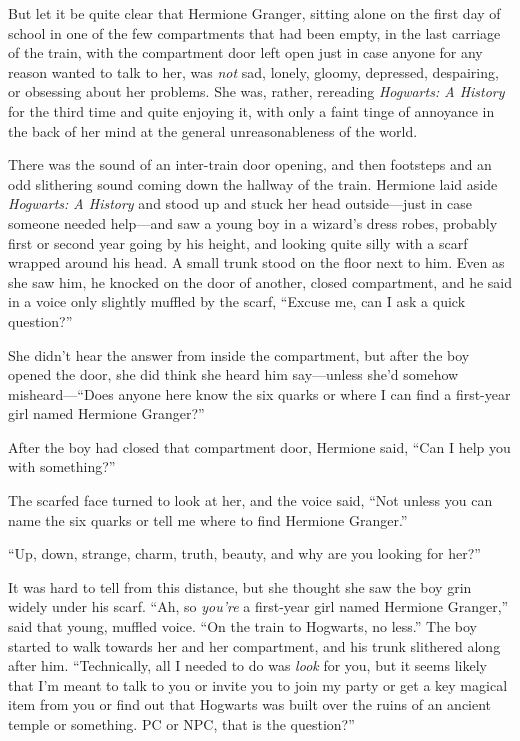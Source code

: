 But let it be quite clear that Hermione Granger, sitting alone on the first day of school in one of the few compartments that had been empty, in the last carriage of the train, with the compartment door left open just in case anyone for any reason wanted to talk to her, was \emph{not} sad, lonely, gloomy, depressed, despairing, or obsessing about her problems. She was, rather, rereading \emph{Hogwarts: A History} for the third time and quite enjoying it, with only a faint tinge of annoyance in the back of her mind at the general unreasonableness of the world.

There was the sound of an inter-train door opening, and then footsteps and an odd slithering sound coming down the hallway of the train. Hermione laid aside \emph{Hogwarts: A History} and stood up and stuck her head outside—just in case someone needed help—and saw a young boy in a wizard’s dress robes, probably first or second year going by his height, and looking quite silly with a scarf wrapped around his head. A small trunk stood on the floor next to him. Even as she saw him, he knocked on the door of another, closed compartment, and he said in a voice only slightly muffled by the scarf, “Excuse me, can I ask a quick question?”

She didn’t hear the answer from inside the compartment, but after the boy opened the door, she did think she heard him say—unless she’d somehow misheard—“Does anyone here know the six quarks or where I can find a first-year girl named Hermione Granger?”

After the boy had closed that compartment door, Hermione said, “Can I help you with something?”

The scarfed face turned to look at her, and the voice said, “Not unless you can name the six quarks or tell me where to find Hermione Granger.”

“Up, down, strange, charm, truth, beauty, and why are you looking for her?”

It was hard to tell from this distance, but she thought she saw the boy grin widely under his scarf. “Ah, so \emph{you’re} a first-year girl named Hermione Granger,” said that young, muffled voice. “On the train to Hogwarts, no less.” The boy started to walk towards her and her compartment, and his trunk slithered along after him. “Technically, all I needed to do was \emph{look} for you, but it seems likely that I’m meant to talk to you or invite you to join my party or get a key magical item from you or find out that Hogwarts was built over the ruins of an ancient temple or something. PC or NPC, that is the question?”

